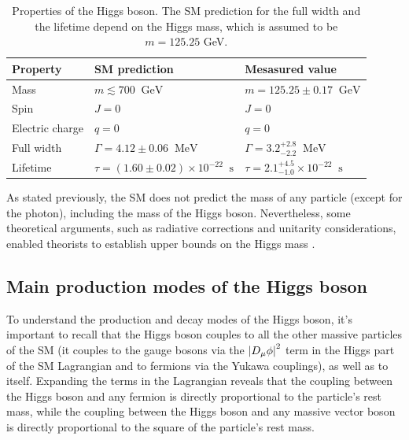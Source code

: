 \begin{table}[ht]
    \centering
    \begin{tabular}{|l|l|l|}
        \hline
        \cellcolor{lightgray}Property & \cellcolor{lightgray}SM prediction & \cellcolor{lightgray}Mesasured value \\ \hline
        Mass                & $m \lesssim 700 \;\; \text{GeV}$ & $m = 125.25 \pm 0.17 \;\; \text{GeV}$             \\
        Spin                &  $J=0$ & $J=0$                                             \\
        Electric charge     & $q=0$  & $q=0$                                             \\
        Full width          & $\Gamma = 4.12 \pm 0.06 \;\;  \text{MeV}$  & $\Gamma = 3.2^{+2.8}_{-2.2} \;\;  \text{MeV}$     \\
        Lifetime            & $\tau = (1.60 \pm 0.02) \times 10^{-22} \;\;  \text{s}$  & $\tau = 2.1^{+4.5}_{-1.0} \times 10^{-22} \;\;  \text{s}$   \\ \hline
    \end{tabular}
    \caption{Properties of the Higgs boson. The SM prediction for the full width and the lifetime depend on the Higgs mass, which is assumed to be $m = 125.25$ GeV.}
    \label{tab:higgs_properties}
\end{table}

As stated previously, the SM does not predict the mass of any particle (except for the photon), including the mass of the Higgs boson. Nevertheless, some theoretical arguments, such as radiative corrections and unitarity considerations, enabled theorists to establish upper bounds on the Higgs mass \cite{Djouadi:2005gi}.

\subsection{Main production modes of the Higgs boson}

To understand the production and decay modes of the Higgs boson, it's important to recall that the Higgs boson couples to all the other massive particles of the SM (it couples to the gauge bosons via the $\left\lvert D_{\mu}\phi\right\rvert^2$ term in the Higgs part of the SM Lagrangian and to fermions via the Yukawa couplings), as well as to itself. Expanding the terms in the Lagrangian reveals that the coupling between the Higgs boson and any fermion is directly proportional to the particle's rest mass, while the coupling between the Higgs boson and any massive vector boson is directly proportional to the square of the particle's rest mass.

